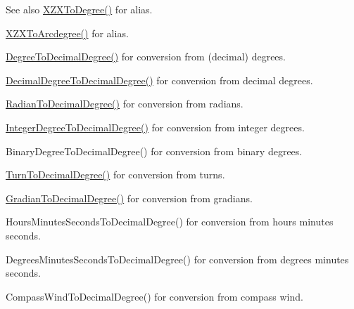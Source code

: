 \begin{DoxySeeAlso}{See also}
\mbox{\hyperlink{group___e_g_x_math-_angle_conversions-_x_z_x_gaf91d111a3f3558dcd147d3832afc1fd6}{X\+Z\+X\+To\+Degree()}} for alias. 

\mbox{\hyperlink{group___e_g_x_math-_angle_conversions-_x_z_x_gade03c99ea870f58dcebd6307beed2364}{X\+Z\+X\+To\+Arcdegree()}} for alias. 

\mbox{\hyperlink{group___e_g_x_math-_angle_conversions-_degree_ga568afc1d436d425bf5d4edea584aee08}{Degree\+To\+Decimal\+Degree()}} for conversion from (decimal) degrees. 

\mbox{\hyperlink{group___e_g_x_math-_angle_conversions-_decimal_degree_gafccf9cd779903872887978ab9d79661f}{Decimal\+Degree\+To\+Decimal\+Degree()}} for conversion from decimal degrees. 

\mbox{\hyperlink{group___e_g_x_math-_angle_conversions-_radian_ga6d170f1882c32de53167c04524d05f67}{Radian\+To\+Decimal\+Degree()}} for conversion from radians. 

\mbox{\hyperlink{group___e_g_x_math-_angle_conversions-_integer_degree_gac219c3198508ba984d8d81d22831b27d}{Integer\+Degree\+To\+Decimal\+Degree()}} for conversion from integer degrees. 

Binary\+Degree\+To\+Decimal\+Degree() for conversion from binary degrees. 

\mbox{\hyperlink{group___e_g_x_math-_angle_conversions-_turn_ga79231536255e77fb7a158b99a30c1767}{Turn\+To\+Decimal\+Degree()}} for conversion from turns. 

\mbox{\hyperlink{group___e_g_x_math-_angle_conversions-_gradian_ga346f47c519d5261b689cec49f4a8e789}{Gradian\+To\+Decimal\+Degree()}} for conversion from gradians. 

Hours\+Minutes\+Seconds\+To\+Decimal\+Degree() for conversion from hours minutes seconds. 

Degrees\+Minutes\+Seconds\+To\+Decimal\+Degree() for conversion from degrees minutes seconds. 

Compass\+Wind\+To\+Decimal\+Degree() for conversion from compass wind. 
\end{DoxySeeAlso}
\mbox{\label{group___e_g_x_math-_angle_conversions-_x_z_x_gaf91d111a3f3558dcd147d3832afc1fd6}} 
